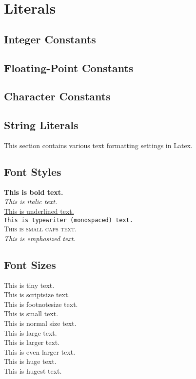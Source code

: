 \section{Literals}

\subsection{Integer Constants}
\subsection{Floating-Point Constants}
\subsection{Character Constants}
\subsection{String Literals}

This section contains various text formatting settings in Latex.

\subsection{Font Styles}

\textbf{This is bold text.}\\
\textit{This is italic text.}\\
\underline{This is underlined text.}\\
\texttt{This is typewriter (monospaced) text.}\\
\textsc{This is small caps text.}\\
\emph{This is emphasized text.}

\subsection{Font Sizes}

\tiny{This is tiny text.}\\
\scriptsize{This is scriptsize text.}\\
\footnotesize{This is footnotesize text.}\\
\small{This is small text.}\\
\normalsize{This is normal size text.}\\
\large{This is large text.}\\
\Large{This is larger text.}\\
\LARGE{This is even larger text.}\\
\huge{This is huge text.}\\
\Huge{This is hugest text.}

